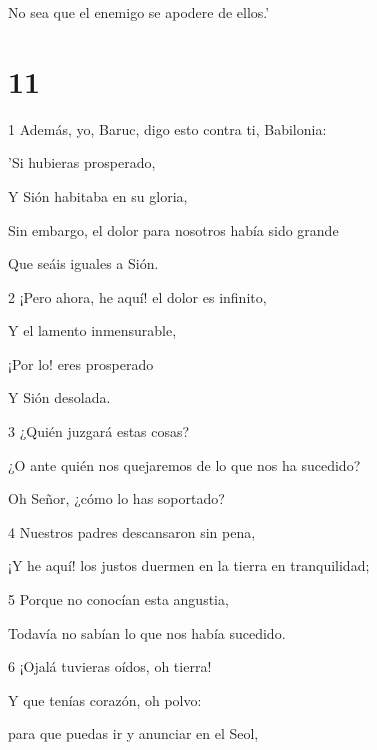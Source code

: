 \par No sea que el enemigo se apodere de ellos.'

\chapter{11}

\par 1 Además, yo, Baruc, digo esto contra ti, Babilonia:

\par 'Si hubieras prosperado,

Y Sión habitaba en su gloria,

\par Sin embargo, el dolor para nosotros había sido grande

\par Que seáis iguales a Sión.

\par 2 ¡Pero ahora, he aquí! el dolor es infinito,

\par Y el lamento inmensurable,

\par ¡Por lo! eres prosperado

\par Y Sión desolada.

\par 3 ¿Quién juzgará estas cosas?

\par ¿O ante quién nos quejaremos de lo que nos ha sucedido?

\par Oh Señor, ¿cómo lo has soportado?

\par 4 Nuestros padres descansaron sin pena,

\par ¡Y he aquí! los justos duermen en la tierra en tranquilidad;

\par 5 Porque no conocían esta angustia,

\par Todavía no sabían lo que nos había sucedido.

\par 6 ¡Ojalá tuvieras oídos, oh tierra!

\par Y que tenías corazón, oh polvo:

\par para que puedas ir y anunciar en el Seol,


